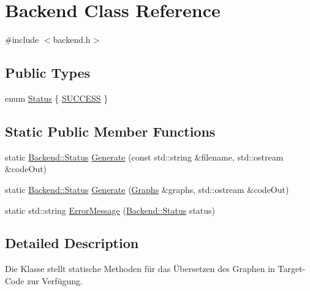 \hypertarget{classBackend}{\section{Backend Class Reference}
\label{classBackend}
}


{\ttfamily \#include $<$backend.\-h$>$}

\subsection*{Public Types}
\begin{DoxyCompactItemize}
\item 
enum \hyperlink{classBackend_a0e8eebed86bd15218f21b068f6c229f2}{Status} \{ \hyperlink{classBackend_a0e8eebed86bd15218f21b068f6c229f2a85c3bbdd79e0c08753992d41f8a7d25c}{S\-U\-C\-C\-E\-S\-S}
 \}
\end{DoxyCompactItemize}
\subsection*{Static Public Member Functions}
\begin{DoxyCompactItemize}
\item 
static \hyperlink{classBackend_a0e8eebed86bd15218f21b068f6c229f2}{Backend\-::\-Status} \hyperlink{classBackend_aa3ad5ea4b71dac952445fbe3762b4d88}{Generate} (const std\-::string \&filename, std\-::ostream \&code\-Out)
\item 
static \hyperlink{classBackend_a0e8eebed86bd15218f21b068f6c229f2}{Backend\-::\-Status} \hyperlink{classBackend_a33fce3d0ea3e4b7038ffb0dbf5503a27}{Generate} (\hyperlink{classGraphs}{Graphs} \&graphs, std\-::ostream \&code\-Out)
\item 
static std\-::string \hyperlink{classBackend_a72370277408a5586b5923bc56433b815}{Error\-Message} (\hyperlink{classBackend_a0e8eebed86bd15218f21b068f6c229f2}{Backend\-::\-Status} status)
\end{DoxyCompactItemize}


\subsection{Detailed Description}
Die Klasse stellt statische Methoden für das Übersetzen des Graphen in Target-\/\-Code zur Verfügung. 

